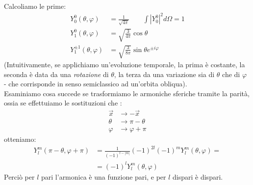 \documentclass[../../FisicaTeorica.tex]{subfiles}
\begin{document}
Calcoliamo le prime:
\begin{align*}
Y^0_0(\theta,\varphi)&=\frac{1}{\sqrt{4\pi}} \qquad \int |Y_0^0|^2 d\Omega =1\\
Y^0_1(\theta,\varphi)&=\sqrt{\frac{3}{4\pi}}\cos\theta\\
Y^{\pm 1}_{1}(\theta,\varphi)&=\sqrt{\frac{3}{8\pi}} \sin\theta e^{\pm i\varphi}
\end{align*}
(Intuitivamente, se applichiamo un'evoluzione temporale, la prima è costante, la seconda è data da una \textit{rotazione} di $\theta$, la terza da una variazione sia di $\theta$ che di $\varphi$ - che corrisponde in senso semiclassico  ad un'orbita obliqua).\\

Esaminiamo cosa succede se trasformiamo le armoniche sferiche tramite la parità, ossia se effettuiamo le sostituzioni che :
\begin{align*}
\vec{x}&\to -\vec{x}\\
\theta &\to \pi-\theta\\
\varphi &\to \varphi+\pi
\end{align*}
otteniamo:
\begin{align*}
Y_l^m(\pi-\theta,\varphi+\pi)&=\frac{1}{(-1)^{l-|m|}}(-1)^{2l}(-1)^m Y^m_l(\theta,\varphi) =\\
&= (-1)^l Y^m_l (\theta,\varphi)
\end{align*}
Perciò per $l$ pari l'armonica è una funzione pari, e per $l$ dispari è dispari.\\
\end{document}
